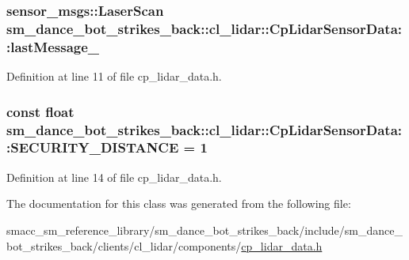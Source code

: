 \subsubsection[{\texorpdfstring{last\+Message\+\_\+}{lastMessage_}}]{\setlength{\rightskip}{0pt plus 5cm}sensor\+\_\+msgs\+::\+Laser\+Scan sm\+\_\+dance\+\_\+bot\+\_\+strikes\+\_\+back\+::cl\+\_\+lidar\+::\+Cp\+Lidar\+Sensor\+Data\+::last\+Message\+\_\+}\hypertarget{classsm__dance__bot__strikes__back_1_1cl__lidar_1_1CpLidarSensorData_a8a84fbb0a3f35a7fc040b266d33075ec}{}\label{classsm__dance__bot__strikes__back_1_1cl__lidar_1_1CpLidarSensorData_a8a84fbb0a3f35a7fc040b266d33075ec}


Definition at line 11 of file cp\+\_\+lidar\+\_\+data.\+h.

\subsubsection[{\texorpdfstring{S\+E\+C\+U\+R\+I\+T\+Y\+\_\+\+D\+I\+S\+T\+A\+N\+CE}{SECURITY_DISTANCE}}]{\setlength{\rightskip}{0pt plus 5cm}const float sm\+\_\+dance\+\_\+bot\+\_\+strikes\+\_\+back\+::cl\+\_\+lidar\+::\+Cp\+Lidar\+Sensor\+Data\+::\+S\+E\+C\+U\+R\+I\+T\+Y\+\_\+\+D\+I\+S\+T\+A\+N\+CE = 1}\hypertarget{classsm__dance__bot__strikes__back_1_1cl__lidar_1_1CpLidarSensorData_aa83f62091b2455323340a87e8636df60}{}\label{classsm__dance__bot__strikes__back_1_1cl__lidar_1_1CpLidarSensorData_aa83f62091b2455323340a87e8636df60}


Definition at line 14 of file cp\+\_\+lidar\+\_\+data.\+h.



The documentation for this class was generated from the following file\+:\begin{DoxyCompactItemize}
\item 
smacc\+\_\+sm\+\_\+reference\+\_\+library/sm\+\_\+dance\+\_\+bot\+\_\+strikes\+\_\+back/include/sm\+\_\+dance\+\_\+bot\+\_\+strikes\+\_\+back/clients/cl\+\_\+lidar/components/\hyperlink{cp__lidar__data_8h}{cp\+\_\+lidar\+\_\+data.\+h}\end{DoxyCompactItemize}
